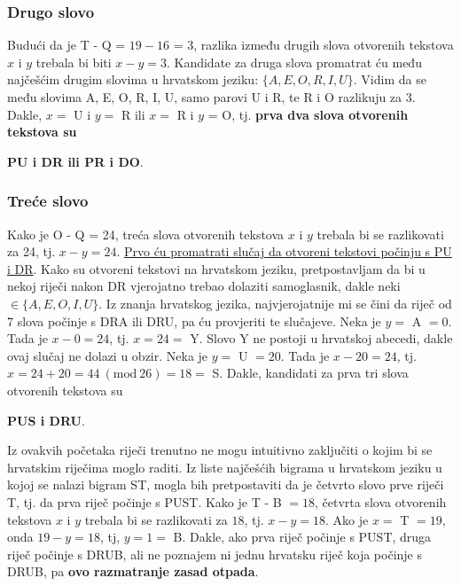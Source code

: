 \documentclass[a4paper,12pt,oneside]{article}
\begin{document}
\subsubsection*{Drugo slovo}
Budući da je T - Q = $19 - 16$ = 3, razlika između drugih slova otvorenih tekstova $x$ i $y$ trebala bi biti $x - y = 3$. Kandidate za druga slova promatrat ću među najčešćim drugim slovima u hrvatskom jeziku: $\{A, E, O, R, I, U\}$. Vidim da se među slovima A, E, O, R, I, U, samo parovi U i R, te R i O razlikuju za 3. Dakle, $x = $ U i $y =$ R ili $x = $ R i $y$ = O, tj. 
\textbf{prva dva slova otvorenih tekstova su}
\begin{center}
	\textbf{PU i DR   ili PR i DO}.
\end{center}

\subsubsection*{Treće slovo}
Kako je O - Q = 24, treća slova otvorenih tekstova $x$ i $y$ trebala bi se razlikovati za 24, tj. $x - y = 24$.
\newline \newline
\underline{Prvo ću promatrati slučaj da otvoreni tekstovi počinju s PU i DR}. Kako su otvoreni tekstovi na hrvatskom jeziku, pretpostavljam da bi u nekoj riječi nakon DR vjerojatno trebao dolaziti samoglasnik, dakle neki $\in \{A, E, O, I, U\}.$ Iz znanja hrvatskog jezika, najvjerojatnije mi se čini da riječ od 7 slova počinje s DRA ili DRU, pa ću provjeriti te slučajeve.
\newline \newline
Neka je $y =$ A $= 0$. Tada je $x - 0 = 24$, tj. $x = 24 = $ Y. Slovo Y ne postoji u hrvatskoj abecedi, dakle ovaj slučaj ne dolazi u obzir.
\newline \newline
Neka je $y =$ U $= 20$. Tada je $x - 20 = 24$, tj. $x = 24 + 20 = 44 \ (\text{mod} \ 26) = 18 =$ S. Dakle, kandidati za prva tri slova otvorenih tekstova su
\begin{center}
	\textbf{PUS i DRU}.
\end{center}
\noindent Iz ovakvih početaka riječi trenutno ne mogu intuitivno zaključiti o kojim bi se hrvatskim riječima moglo raditi. Iz liste najčešćih bigrama u hrvatskom jeziku u kojoj se nalazi bigram ST, mogla bih pretpostaviti da je četvrto slovo prve riječi T, tj. da prva riječ počinje s PUST. Kako je T - B $= 18$, četvrta slova otvorenih tekstova $x$ i $y$ trebala bi se razlikovati za $18$, tj. $x - y = 18$. Ako je $x =$ T $= 19$, onda $19 - y = 18$, tj, $y = 1 = $ B. Dakle, ako prva riječ počinje s PUST, druga riječ počinje s DRUB, ali ne poznajem ni jednu hrvatsku riječ koja počinje s DRUB, pa \textbf{ovo razmatranje zasad otpada}. \newline
\end{document}
